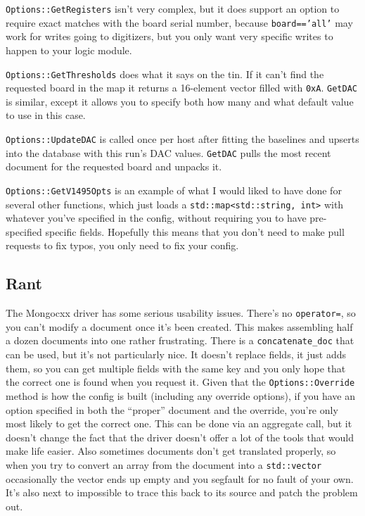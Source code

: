 \texttt{Options::GetRegisters} isn't very complex, but it does support an option to require exact matches with the board serial number, because \texttt{board=='all'} may work for writes going to digitizers, but you only want very specific writes to happen to your logic module.

\texttt{Options::GetThresholds} does what it says on the tin. If it can't find the requested board in the map it returns a 16-element vector filled with \texttt{0xA}. \texttt{GetDAC} is similar, except it allows you to specify both how many and what default value to use in this case.

\texttt{Options::UpdateDAC} is called once per host after fitting the baselines and upserts into the database with this run's DAC values. \texttt{GetDAC} pulls the most recent document for the requested board and unpacks it.

\texttt{Options::GetV1495Opts} is an example of what I would liked to have done for several other functions, which just loads a \texttt{std::map<std::string, int>} with whatever you've specified in the config, without requiring you to have pre-specified specific fields.
Hopefully this means that you don't need to make pull requests to fix typos, you only need to fix your config.

\subsection{Rant}

The Mongocxx driver has some serious usability issues.
There's no \texttt{operator=}, so you can't modify a document once it's been created.
This makes assembling half a dozen documents into one rather frustrating.
There is a \texttt{concatenate\_doc} that can be used, but it's not particularly nice.
It doesn't replace fields, it just adds them, so you can get multiple fields with the same key and you only hope that the correct one is found when you request it.
Given that the \texttt{Options::Override} method is how the config is built (including any override options), if you have an option specified in both the ``proper'' document and the override, you're only most likely to get the correct one.
This can be done via an aggregate call, but it doesn't change the fact that the driver doesn't offer a lot of the tools that would make life easier.
Also sometimes documents don't get translated properly, so when you try to convert an array from the document into a \texttt{std::vector} occasionally the vector ends up empty and you segfault for no fault of your own.
It's also next to impossible to trace this back to its source and patch the problem out.

